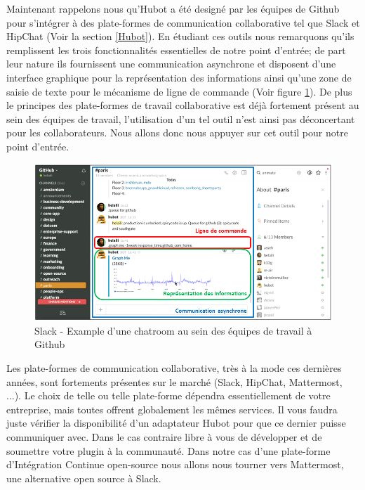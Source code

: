         Maintenant rappelons nous qu'Hubot a été designé par les équipes de Github pour s'intégrer à des plate-formes de communication collaborative tel que Slack et HipChat (Voir la section \ref{Hubot}). En étudiant ces outils nous remarquons qu'ils remplissent les trois fonctionnalités essentielles de notre point d'entrée; de part leur nature ils fournissent une communication asynchrone et disposent d'une interface graphique pour la représentation des informations ainsi qu'une zone de saisie de texte pour le mécanisme de ligne de commande (Voir figure {\ref{Slack}}). De plus le principes des plate-formes de travail collaborative est déjà fortement présent au sein des équipes de travail, l'utilisation d'un tel outil n'est ainsi pas déconcertant pour les collaborateurs. Nous allons donc nous appuyer sur cet outil pour notre point d'entrée.\\

        \begin{figure}
          \begin{center}
            \includegraphics[scale=0.5]{images/Slack.png}
          \end{center}
          \caption{Slack - Example d'une chatroom au sein des équipes de travail à Github}
          \label{Slack}
        \end{figure}

        Les plate-formes de communication collaborative, très à la mode ces dernières années, sont fortements présentes sur le marché (Slack, HipChat, Mattermost, ...). Le choix de telle ou telle plate-forme dépendra essentiellement de votre entreprise, mais toutes offrent globalement les mêmes services. Il vous faudra juste vérifier la disponibilité d'un adaptateur Hubot pour que ce dernier puisse communiquer avec. Dans le cas contraire libre à vous de développer et de soumettre votre plugin à la communauté. Dans notre cas d'une plate-forme d'Intégration Continue open-source nous allons nous tourner vers Mattermost, une alternative open source à Slack.

